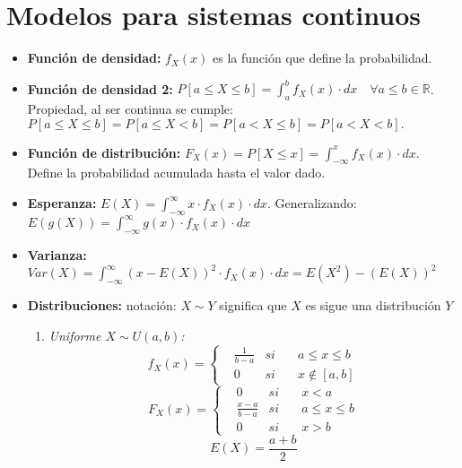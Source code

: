 \documentclass[a4paper, twocolumn, 10pt]{article}
\begin{document}
\section{Modelos para sistemas continuos}

\begin{itemize}
	\item \textbf{Función de densidad:} $f_X(x)$ es la función que define la probabilidad.
	\item \textbf{Función de densidad 2:} $\displaystyle P\left[a \leq X \leq b\right] = \int_{a}^{b}f_X(x)\cdot dx \quad \forall a\leq b \in \mathbb{R}$. Propiedad, al ser continua se cumple: $P\left[a \leq X \leq b\right] = P\left[a \leq X < b\right] = P\left[a < X \leq b\right] = P\left[a < X < b\right].$
	\item \textbf{Función de distribución:} $F_X(x) = P\left[X \leq x\right] = \displaystyle \int_{-\infty}^{x}f_X(x)\cdot dx$. Define la probabilidad acumulada hasta el valor dado.
	\item \textbf{Esperanza:} $E(X) = \displaystyle \int_{-\infty}^{\infty}x\cdot f_X(x)\cdot dx$. Generalizando: $E(g(X)) = \displaystyle \int_{-\infty}^{\infty}g(x)\cdot f_X(x)\cdot dx$
	\item \textbf{Varianza:} $Var(X) = \displaystyle \int_{-\infty}^{\infty}\left(x - E(X)\right)^2 \cdot f_X(x) \cdot dx = E(X^2) -(E(X))^2$
	\item \textbf{Distribuciones:} notación: $X\sim Y$ significa que $X$ es sigue una distribución $Y$
	\begin{enumerate}
		\item \textit{Uniforme $X\sim U(a,b)$:}
		\begin{equation*}
			f_X(x) = \left\lbrace
			\begin{aligned}
			&\frac{1}{b-a} & si \quad& a\leq x\leq b \\
			& 0 & si \quad & x \notin\left[a,b\right]
			\end{aligned} \right.
		\end{equation*}
		\begin{equation*}
			F_X(x) = \left\lbrace
			\begin{aligned}
			& 0 & si \quad & x < a \\
			&\frac{x-a}{b-a} & si \quad& a\leq x\leq b \\
			& 0 & si \quad & x >b
			\end{aligned} \right.
		\end{equation*}
		\begin{equation*}
			E(X) = \frac{a + b}{2}

\end{equation*}
\end{enumerate}
\end{itemize}
\end{document}
